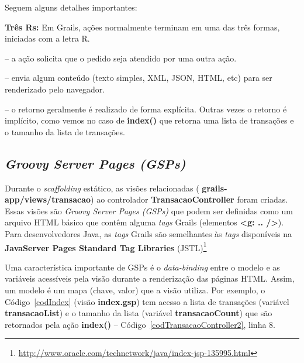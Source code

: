 \vspace{0.3cm}

Seguem alguns detalhes importantes:

\vspace{0.3cm}

\begin{cBox}
\begin{small}
{\bf Três  Rs:} Em Grails,  ações normalmente terminam  em uma das  três formas,
iniciadas com a letra R.

\vspace{0.3cm}
  -- a ação  solicita que o pedido  seja atendido
por uma outra ação.

\vspace{0.3cm}
  -- envia algum conteúdo (texto  simples, XML, JSON,
HTML, etc) para ser renderizado pelo navegador.

\vspace{0.3cm}
 --  o retorno geralmente é realizado  de forma explícita.
Outras vezes  o retorno  é implícito, como  vemos no  caso de {\bf  index()} que
retorna uma lista de transações e o tamanho da lista de transações.  
\end{small}
\end{cBox}

\subsection{{\it Groovy Server Pages (GSPs)}}

\vspace{0.3cm}

Durante   o   {\it  scaffolding}   estático,   as   visões  relacionadas   ({\bf
  grails-app/views/transacao})  ao controlador  {\bf  TransacaoController} foram
criadas.  Essas  visões são  {\it  Groovy Server  Pages  (GSPs)}  que podem  ser
definidas  como um  arquivo  HTML básico  que  contêm alguma  {\it tags}  Grails
(elementos {\bf <g:  ..  />}).  Para desenvolvedores Java,  as {\it tags} Grails
são semelhantes às {\it tags}  disponíveis na {\bf JavaServer Pages Standard Tag
  Libraries}
(JSTL)\footnote{\url{http://www.oracle.com/technetwork/java/index-jsp-135995.html}}

\vspace{0.2cm}

Uma característica importante de GSPs é o {\it data-binding} entre o modelo e as
variáveis acessíveis pela visão durante a renderização das páginas HTML.  Assim,
um  modelo  é um  mapa  (chave,  valor) que  a  visão  utiliza.  Por exemplo,  o
Código~\ref{codIndex} (visão  {\bf index.gsp}) tem acesso a  lista de transações
(variável   {\bf  transacaoList})   e  o   tamanho  da   lista   (variável  {\bf
  transacaoCount})   que   são   retornados   pela   ação   {\bf   index()}   --
Código~\ref{codTransacaoController2}, linha 8.  

